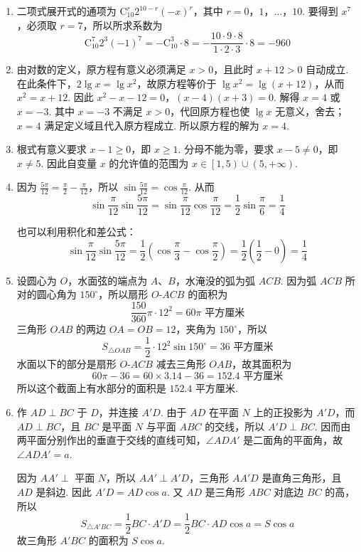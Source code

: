 \begin{solution}
\begin{enumerate}
\item 二项式展开式的通项为 \(\mathrm C_{10}^{r}2^{10-r}(-x)^r\)，其中 \(r=0\)，\(1\)，\(\ldots\)，\(10\). 要得到 \(x^7\)，必须取 \(r=7\)，所以所求系数为
\[
\mathrm C_{10}^{7}2^3(-1)^7=-\mathrm C_{10}^{3}\cdot8=-\frac{10\cdot9\cdot8}{1\cdot2\cdot3}\cdot8=-960
\]

\item 由对数的定义，原方程有意义必须满足 \(x>0\)，且此时 \(x+12>0\) 自动成立. 在此条件下，\(2\lg x=\lg x^2\)，故原方程等价于 \(\lg x^2=\lg\left(x+12\right)\)，从而 \(x^2=x+12\). 因此
\(x^2-x-12=0\)，\(\left(x-4\right)\left(x+3\right)=0\).
解得 \(x=4\) 或 \(x=-3\). 其中 \(x=-3\) 不满足 \(x>0\)，代回原方程也使 \(\lg x\) 无意义，舍去；\(x=4\) 满足定义域且代入原方程成立. 所以原方程的解为 \(x=4\).

\item 根式有意义要求 \(x-1\geq0\)，即 \(x\geq1\). 分母不能为零，要求 \(x-5\neq0\)，即 \(x\neq5\). 因此自变量 \(x\) 的允许值的范围为 \(x\in\left[1,5\right)\cup\left(5,+\infty\right)\).

\item 因为 \(\frac{5\pi}{12}=\frac{\pi}{2}-\frac{\pi}{12}\)，所以 \(\sin\frac{5\pi}{12}=\cos\frac{\pi}{12}\). 从而
\[
\sin\frac{\pi}{12}\sin\frac{5\pi}{12}=\sin\frac{\pi}{12}\cos\frac{\pi}{12}=\frac{1}{2}\sin\frac{\pi}{6}=\frac{1}{4}
\]

也可以利用积化和差公式：
\[
\sin\frac{\pi}{12}\sin\frac{5\pi}{12}=\frac{1}{2}\left(\cos\frac{\pi}{3}-\cos\frac{\pi}{2}\right)=\frac{1}{2}\left(\frac{1}{2}-0\right)=\frac{1}{4}
\]

\item 设圆心为 \(O\)，水面弦的端点为 \(A\)、\(B\)，水淹没的弧为弧 \(ACB\). 因为弧 \(ACB\) 所对的圆心角为 \(150^\circ\)，所以扇形 \(O\text{-}ACB\) 的面积为
\[
\frac{150}{360}\pi\cdot12^2=60\pi\text{ 平方厘米}
\]
三角形 \(OAB\) 的两边 \(OA=OB=12\)，夹角为 \(150^\circ\)，所以
\[
S_{\triangle OAB}=\frac{1}{2}\cdot12^2\sin150^\circ=36\text{ 平方厘米}
\]
水面以下的部分是扇形 \(O\text{-}ACB\) 减去三角形 \(OAB\)，故其面积为
\[
60\pi-36=60\times3.14-36=152.4\text{ 平方厘米}
\]
所以这个截面上有水部分的面积是 \(152.4\text{ 平方厘米}\).

\item 作 \(AD\perp BC\) 于 \(D\)，并连接 \(A'D\). 由于 \(AD\) 在平面 \(N\) 上的正投影为 \(A'D\)，而 \(AD\perp BC\)，且 \(BC\) 是平面 \(N\) 与平面 \(ABC\) 的交线，所以 \(A'D\perp BC\). 因而由两平面分别作出的垂直于交线的直线可知，\(\angle ADA'\) 是二面角的平面角，故 \(\angle ADA'=a\).


因为 \(AA'\perp\) 平面 \(N\)，所以 \(AA'\perp A'D\)，三角形 \(AA'D\) 是直角三角形，且 \(AD\) 是斜边. 因此 \(A'D=AD\cos a\). 又 \(AD\) 是三角形 \(ABC\) 对底边 \(BC\) 的高，所以
\[
S_{\triangle A'BC}=\frac{1}{2}BC\cdot A'D=\frac{1}{2}BC\cdot AD\cos a=S\cos a
\]
故三角形 \(A'BC\) 的面积为 \(S\cos a\).
\end{enumerate}
\end{solution}

